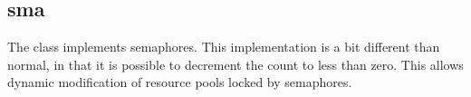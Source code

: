 %
%
%
%
%              

\subsection{sma}
\label{sma}

The  class implements semaphores.  This implementation is a bit
different than normal, in that it is possible to decrement the count to less
than zero.  This allows dynamic modification of resource pools locked by
semaphores.

